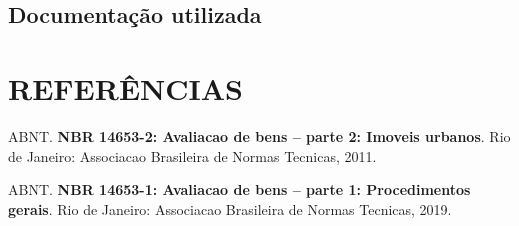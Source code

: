 \documentclass[
  10pt,
  a4paper]{article}
\newlength{\cslhangindent}
\newenvironment{CSLReferences}[2] %
 {\begin{list}{}{%
  \setlength{\itemindent}{0pt}
  \setlength{\leftmargin}{0pt}
  \setlength{\parsep}{0pt}
  \ifodd #1
   \setlength{\leftmargin}{\cslhangindent}
   \setlength{\itemindent}{-1\cslhangindent}
  \fi
  \setlength{\itemsep}{#2\baselineskip}}}
 {\end{list}}
\begin{document}
\subsection*{Documentação
utilizada}\label{documentauxe7uxe3o-utilizada-1}









\section*{REFERÊNCIAS}\label{referuxeancias}

\label{refs}
\begin{CSLReferences}{0}{0}
ABNT. \textbf{{NBR} 14653-2: Avaliacao de bens -- parte 2: Imoveis
urbanos}. Rio de Janeiro: Associacao Brasileira de Normas Tecnicas,
2011.

ABNT. \textbf{{NBR} 14653-1: Avaliacao de bens -- parte 1: Procedimentos
gerais}. Rio de Janeiro: Associacao Brasileira de Normas Tecnicas, 2019.

\end{CSLReferences}
\end{document}
